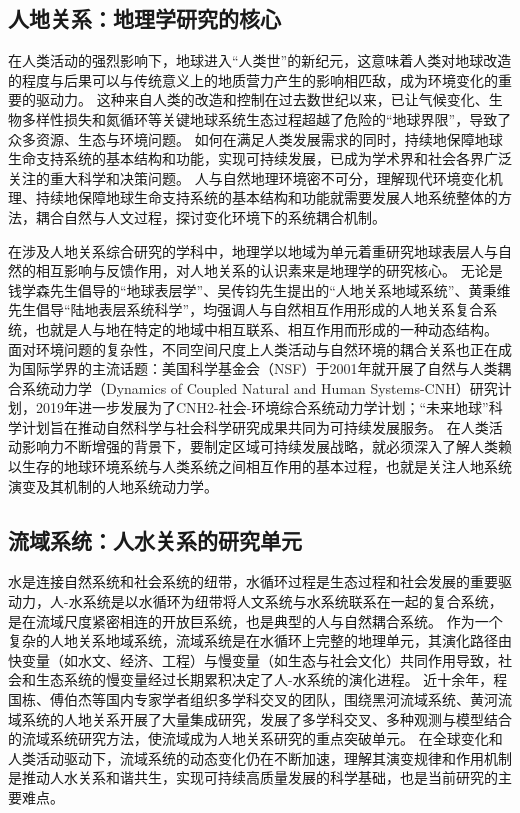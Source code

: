 \subsection{人地关系：地理学研究的核心}

在人类活动的强烈影响下，地球进入“人类世”的新纪元，这意味着人类对地球改造的程度与后果可以与传统意义上的地质营力产生的影响相匹敌，成为环境变化的重要的驱动力\cite{lenton2019, lewis2015, lewis2018}。
这种来自人类的改造和控制在过去数世纪以来，已让气候变化、生物多样性损失和氮循环等关键地球系统生态过程超越了危险的“地球界限”，导致了众多资源、生态与环境问题\cite{steffen2015}。
如何在满足人类发展需求的同时，持续地保障地球生命支持系统的基本结构和功能，实现可持续发展，已成为学术界和社会各界广泛关注的重大科学和决策问题\cite{wu2014}。
人与自然地理环境密不可分，理解现代环境变化机理、持续地保障地球生命支持系统的基本结构和功能就需要发展人地系统整体的方法，耦合自然与人文过程，探讨变化环境下的系统耦合机制\cite{fu2015}。

在涉及人地关系综合研究的学科中，地理学以地域为单元着重研究地球表层人与自然的相互影响与反馈作用，对人地关系的认识素来是地理学的研究核心\cite{wu1991}。
无论是钱学森先生倡导的“地球表层学”、吴传钧先生提出的“人地关系地域系统”、黄秉维先生倡导“陆地表层系统科学”，均强调人与自然相互作用形成的人地关系复合系统，也就是人与地在特定的地域中相互联系、相互作用而形成的一种动态结构。
面对环境问题的复杂性，不同空间尺度上人类活动与自然环境的耦合关系也正在成为国际学界的主流话题\cite{fu2015}：美国科学基金会（NSF）于2001年就开展了自然与人类耦合系统动力学（Dynamics of Coupled Natural and Human Systems-CNH）研究计划，2019年进一步发展为了CNH2-社会-环境综合系统动力学计划；“未来地球”科学计划旨在推动自然科学与社会科学研究成果共同为可持续发展服务。
在人类活动影响力不断增强的背景下，要制定区域可持续发展战略，就必须深入了解人类赖以生存的地球环境系统与人类系统之间相互作用的基本过程，也就是关注人地系统演变及其机制的人地系统动力学\cite{fu2022}。

\subsection{流域系统：人水关系的研究单元}

水是连接自然系统和社会系统的纽带，水循环过程是生态过程和社会发展的重要驱动力，人-水系统是以水循环为纽带将人文系统与水系统联系在一起的复合系统，是在流域尺度紧密相连的开放巨系统，也是典型的人与自然耦合系统\cite{li2007}。
作为一个复杂的人地关系地域系统，流域系统是在水循环上完整的地理单元，其演化路径由快变量（如水文、经济、工程）与慢变量（如生态与社会文化）共同作用导致，社会和生态系统的慢变量经过长期累积决定了人-水系统的演化进程\cite{falkenmark2021}。
近十余年，程国栋、傅伯杰等国内专家学者组织多学科交叉的团队，围绕黑河流域系统、黄河流域系统的人地关系开展了大量集成研究，发展了多学科交叉、多种观测与模型结合的流域系统研究方法，使流域成为人地关系研究的重点突破单元\cite{cheng2014, fu2021a}。
在全球变化和人类活动驱动下，流域系统的动态变化仍在不断加速，理解其演变规律和作用机制是推动人水关系和谐共生，实现可持续高质量发展的科学基础，也是当前研究的主要难点\cite{reyers2018}。

